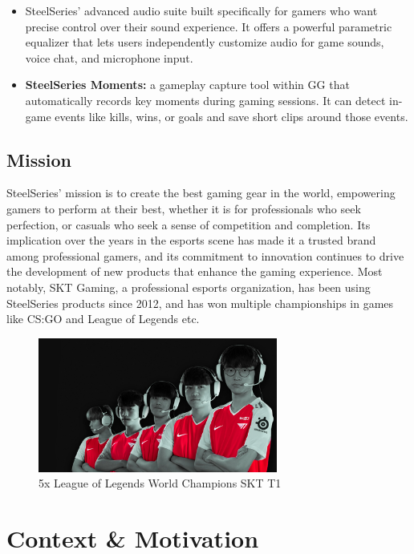 \begin{itemize}
\begin{itemize}
        \item SteelSeries' advanced audio suite built specifically for gamers who want precise control over their sound experience. It offers a powerful parametric equalizer that lets users independently customize audio for game sounds, voice chat, and microphone input.
        \item \textbf{SteelSeries Moments:} a gameplay capture tool within GG that automatically records key moments during gaming sessions. It can detect in-game events like kills, wins, or goals and save short clips around those events.
        \end{itemize} 
\end{itemize}

\subsection{Mission}
SteelSeries' mission is to create the best gaming gear in the world, empowering gamers to perform at their best, whether it is for professionals who seek perfection, or casuals who seek a sense of competition and completion. Its implication over the years in the esports scene has made it a trusted brand among professional gamers, and its commitment to innovation continues to drive the development of new products that enhance the gaming experience. Most notably, SKT Gaming, a professional esports organization, has been using SteelSeries products since 2012, and has won multiple championships in games like CS:GO and League of Legends etc.
\begin{figure}[h!]
    \centering
    \includegraphics[width=0.7\textwidth]{ressources/sktt1.png}
    \caption{5x League of Legends World Champions SKT T1}
    \label{fig:5x League of Legends World Champions SKT T1}
\end{figure}
\section{Context \& Motivation}
